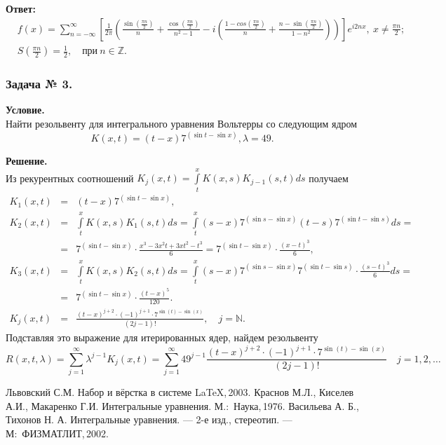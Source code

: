 \documentclass[12pt]{article}
\begin{document}
\noindent
\textbf{Ответ:}
\[
\begin{split}
&f(x)=\sum_{n=-\infty}^\infty\left[ \frac{1}{2\pi}\left(
\frac{\sin(\frac{\pi n}{2})}{n} + \frac{\cos(\frac{\pi n}{2})}{n^2-1}
- i \left(\frac{1 - cos(\frac{\pi n}{2})}{n} + \frac{n - \sin(\frac{\pi n}{2})}{1 - n^2}\right) \right) \right] e^{i2 nx},~ x\ne \frac{\pi n}{2}; \\
&S(\frac{\pi n}{2})=\frac{1}{2},\quad\text{при}~n\in\mathbb{Z}.
\end{split}
\]


\subsubsection*{\center Задача № 3.}
{\bf Условие.~}\\
Найти резольвенту для интегрального уравнения Вольтерры со следующим ядром 
$$K(x,t)=(t-x)7^{(\sin{t}-\sin{x})}, \lambda = 49.$$

\noindent
{\bf Решение.~}\\
\noindent
Из рекурентных соотношений $K_j(x,t)=\int\limits_t^x K(x,s)K_{j-1}(s,t)ds$ получаем
$$
\begin{array}{rcl}
K_1(x,t)&=&\displaystyle (t-x)7^{(\sin{t}-\sin{x})}, \\[12pt]
K_2(x,t)&=&\displaystyle\int\limits_t^x K(x,s)K_1(s,t)ds = \int\limits_t^x (s-x)7^{(\sin{s}-\sin{x})}
(t-s)7^{(\sin{t}-\sin{s})} ds = {}\\[12pt]
&=&\displaystyle 7^{(\sin{t}-\sin{x})}\cdot \frac{x^3-3x^2 t + 3xt^2 -t^3}{6} = 7^{(\sin{t}-\sin{x})}\cdot \frac{(x-t)^3}{6},\\[12pt]
K_3(x,t)&=&\displaystyle\int\limits_t^x K(x,s)K_2(s,t)ds = \int\limits_t^x (s-x)7^{(\sin{s}-\sin{x})} 7^{(\sin{t}-\sin{s})}\cdot \frac{(s-t)^3}{6}  ds = {}\\[12pt]
&=&\displaystyle 7^{(\sin{t}-\sin{x})}\cdot \frac{(t-x)^5}{120}.\\[12pt]
K_j(x,t)&=&\displaystyle \frac{(t-x)^{j+2}\cdot (-1)^{j+1}\cdot 7^{\sin(t)-\sin(x)}}{(2j-1)!},\quad j=\mathbb{N}.
\end{array}
$$
Подставляя это выражение для итерированных ядер, найдем резольвенту
$$ 
R(x,t,\lambda)=\sum_{j=1}^\infty \lambda^{j-1}K_j(x,t) = \sum_{j=1}^\infty 49^{j-1} \frac{(t-x)^{j+2}\cdot (-1)^{j+1} \cdot7^{\sin(t)-\sin(x)}}{(2j-1)!}
\quad j=1,2,\ldots
$$


\newpage
{}
\begin{thebibliography}{99}
 Львовский С.М. Набор и вёрстка в системе \LaTeX,\,2003.
 Краснов М.Л., Киселев А.И., Макаренко Г.И. Интегральные уравнения. М.:~Наука,\,1976.
 Васильева А. Б., Тихонов Н. А. Интегральные уравнения. --- 2-е изд., стереотип. --- М:~ФИЗМАТЛИТ,\,2002.
\end{thebibliography}
\end{document}
